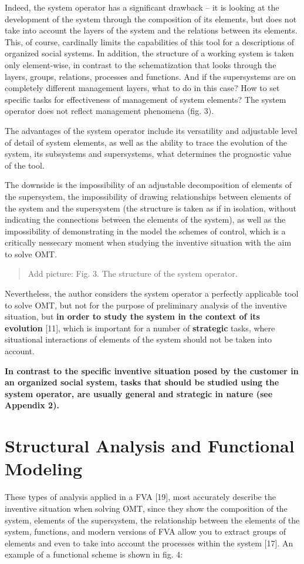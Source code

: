 \documentclass[11pt,a4paper]{book}
\newcommand{\addpicture}[1]{
  \begin{quote} Add picture: #1\end{quote}
}
\begin{document}
Indeed, the system operator has a significant drawback -- it is looking at the
development of the system through the composition of its elements, but does
not take into account the layers of the system and the relations between its
elements. This, of course, cardinally limits the capabilities of this tool for
a descriptions of organized social systems. In addition, the structure of a
working system is taken only element-wise, in contrast to the schematization
that looks through the layers, groups, relations, processes and functions. And
if the supersystems are on completely different management layers, what to do
in this case? How to set specific tasks for effectiveness of management of
system elements?  The system operator does not reflect management phenomena
(fig. 3).

The advantages of the system operator include its versatility and adjustable
level of detail of system elements, as well as the ability to trace the
evolution of the system, its subsystems and supersystems, what determines the
prognostic value of the tool.

The downside is the impossibility of an adjustable decomposition of elements
of the supersystem, the impossibility of drawing relationships between
elements of the system and the supersystem (the structure is taken as if in
isolation, without indicating the connections between the elements of the
system), as well as the impossibility of demonstrating in the model the
schemes of control, which is a critically nessecary moment when studying the
inventive situation with the aim to solve OMT.

\addpicture{Fig. 3. The structure of the system operator.}

Nevertheless, the author considers the system operator a perfectly applicable
tool to solve OMT, but not for the purpose of preliminary analysis of the
inventive situation, but \textbf{in order to study the system in the context
  of its evolution} [11], which is important for a number of
\textbf{strategic} tasks, where situational interactions of elements of the
system should not be taken into account.

\textbf{In contrast to the specific inventive situation posed by the customer
  in an organized social system, tasks that should be studied using the system
  operator, are usually general and strategic in nature (see Appendix 2).}

\section{Structural Analysis and Functional Modeling}
These types of analysis applied in a FVA [19], most accurately describe the
inventive situation when solving OMT, since they show the composition of the
system, elements of the supersystem, the relationship between the elements of
the system, functions, and modern versions of FVA allow you to extract groups
of elements and even to take into account the processes within the system
[17]. An example of a functional scheme is shown in fig. 4:
\end{document}
